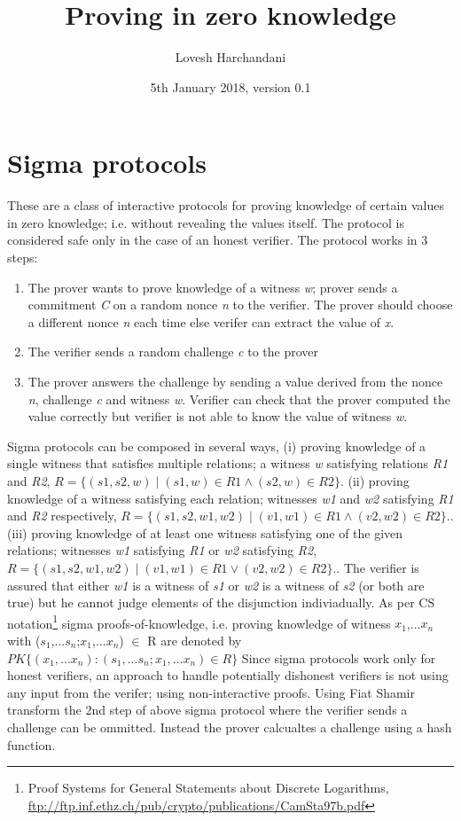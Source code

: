 \documentclass[a4paper]{article}
\title{Proving in zero knowledge}
\author{Lovesh Harchandani}
\date{5th January 2018, version 0.1}
\begin{document}
\maketitle

\section{Sigma protocols}
These are a class of interactive protocols for proving knowledge of certain values in zero knowledge; i.e. without revealing the values itself. The protocol is considered safe only in the case of an honest verifier. The protocol works in 3 steps:
\begin{enumerate}
  \item The prover wants to prove knowledge of a witness \emph{w}; prover sends a commitment \emph{C} on a random nonce \emph{n} to the verifier. The prover should choose a different nonce \emph{n} each time else verifer can extract the value of \emph{x}.
  \item The verifier sends a random challenge \emph{c} to the prover
  \item The prover answers the challenge by sending a value derived from the nonce \emph{n}, challenge \emph{c} and witness \emph{w}.  Verifier can check that the prover computed the value correctly but verifier is not able to know the value of witness \emph{w}.
\end{enumerate}
Sigma protocols can be composed in several ways, (i) proving knowledge of a single witness that satisfies multiple relations; a witness \textit{w} satisfying relations \textit{R1} and \textit{R2}, $ R=\{(s1,s2,w) \mid (s1,w) \in R1 \land (s2,w) \in R2\} $. (ii) proving knowledge of a witness satisfying each relation; witnesses \textit{w1} and \textit{w2} satisfying \textit{R1} and \textit{R2} respectively, $ R=\{(s1,s2,w1,w2) \mid (v1,w1) \in R1 \land (v2,w2) \in R2\}. $. (iii) proving knowledge of at least one witness satisfying one of the given relations; witnesses \textit{w1} satisfying \textit{R1}  or \textit{w2} satisfying \textit{R2}, $ R=\{(s1,s2,w1,w2) \mid (v1,w1) \in R1 \lor (v2,w2) \in R2\}. $. The verifier is assured that either \textit{w1} is a witness of \textit{s1} or \textit{w2} is a witness of \textit{s2} (or both are true) but he cannot judge elements of the disjunction indiviadually. 
As per CS notation\footnote{Proof Systems for General Statements about Discrete Logarithms, \url{ftp://ftp.inf.ethz.ch/pub/crypto/publications/CamSta97b.pdf}} sigma proofs-of-knowledge, i.e. proving knowledge of witness $x_1$,...$x_n$ with ($s_1$,...$s_n$;$x_1$,...$x_n$) $\in$ R are denoted by $ PK\{(x_1,...x_n) : (s_1,...s_n;x_1,...x_n) \in R\} $
\newline
Since sigma protocols work only for honest verifiers, an approach to handle potentially dishonest verifiers is not using any input from the verifer; using  non-interactive proofs. Using Fiat Shamir transform the 2nd step of above sigma protocol where the verifier sends a challenge can be ommitted. Instead the prover calcualtes a challenge using a hash function.
\end{document}

